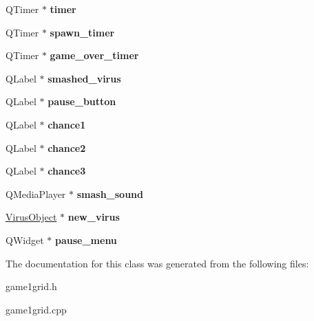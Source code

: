 \begin{DoxyCompactItemize}
\item 
\mbox{\label{classGame1Grid_a704f60910763788b7b4290899659094e}} 
Q\+Timer $\ast$ {\bfseries timer}
\item 
\mbox{\label{classGame1Grid_aed7fa5755da0eafafc6ad176868c6211}} 
Q\+Timer $\ast$ {\bfseries spawn\+\_\+timer}
\item 
\mbox{\label{classGame1Grid_a21e20444387661ce1b03d6fee93a4a54}} 
Q\+Timer $\ast$ {\bfseries game\+\_\+over\+\_\+timer}
\item 
\mbox{\label{classGame1Grid_abdcd3810ae3ffd32be7c7df6c63c090b}} 
Q\+Label $\ast$ {\bfseries smashed\+\_\+virus}
\item 
\mbox{\label{classGame1Grid_ad9deaa715b470d17465b11d3165de7e5}} 
Q\+Label $\ast$ {\bfseries pause\+\_\+button}
\item 
\mbox{\label{classGame1Grid_a3cc574efec2c81436dd9081325931753}} 
Q\+Label $\ast$ {\bfseries chance1}
\item 
\mbox{\label{classGame1Grid_a73f9c88cdaecd0f6568159916468274e}} 
Q\+Label $\ast$ {\bfseries chance2}
\item 
\mbox{\label{classGame1Grid_ab641979a2d65824cdaefe7b71cc17693}} 
Q\+Label $\ast$ {\bfseries chance3}
\item 
\mbox{\label{classGame1Grid_ab0879815a101f197acda0cf04f60bee8}} 
Q\+Media\+Player $\ast$ {\bfseries smash\+\_\+sound}
\item 
\mbox{\label{classGame1Grid_a756e336e0c58d2a882cc7bb53b8ef400}} 
\hyperlink{classVirusObject}{Virus\+Object} $\ast$ {\bfseries new\+\_\+virus}
\item 
\mbox{\label{classGame1Grid_a71771dc2fc0122c6a07d3fb8446ed115}} 
Q\+Widget $\ast$ {\bfseries pause\+\_\+menu}
\end{DoxyCompactItemize}


The documentation for this class was generated from the following files\+:\begin{DoxyCompactItemize}
\item 
game1grid.\+h\item 
game1grid.\+cpp\end{DoxyCompactItemize}
